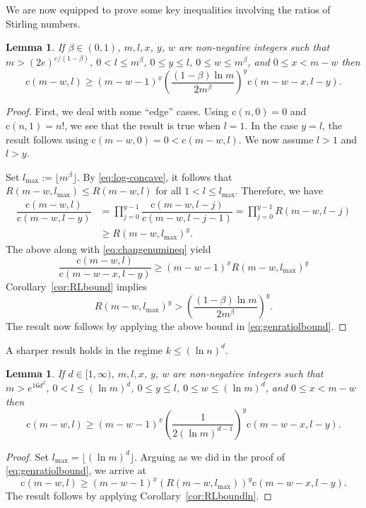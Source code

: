 \documentclass{amsart}
\newtheorem{lem}[thm]{Lemma}
\newcommand{\st}{\mathrm{c}}
\newcommand{\ff}[1]{^{\underline{#1}}}
\begin{document}
We are now equipped to prove some key inequalities involving the ratios of Stirling numbers.
\begin{lem}\label{lem:keyineq}
If $\beta \in (0,1)$, $m,l,x$, $y$, $w$ are non-negative integers such that $m>(2e)^{e/(1-\beta)}$, $0<l\leq m^{\beta}$, $0\leq y\leq l$, $0\leq w\leq m^{\beta}$, and $0\leq x< m-w$ then 
\[ \st(m-w,l) \geq  (m-w-1)\ff{x} \left(\dfrac{(1-\beta)\ln m}{2m^{\beta}} \right)^{y} \st(m-w-x,l-y). \]
\end{lem}
\begin{proof}
First, we deal with some ``edge'' cases. Using $\st(n,0)=0$ and $\st(n,1)=n!$, we see that the result is true when $l=1$. In the case $y=l$, the result follows using $\st(m-w,0)=0<\st(m-w,l)$. We now assume $l>1$ and $l>y$.

Set $l_{\max}:=\lfloor m^{\beta} \rfloor$. By \eqref{eq:log-concave}, it follows that $R(m-w,l_{\max})\leq R(m-w,l)$ for all $1<l\leq l_{\max}$. Therefore, we have
\begin{align*}
   \dfrac{\st(m-w,l)}{\st(m-w,l-y)} &=  \prod_{j=0}^{y-1} \dfrac{\st(m-w,l-j)}{\st(m-w,l-j-1)}=  \prod_{j=0}^{y-1} R(m-w,l-j)\\& \geq  R(m-w,l_{\max})^{y}.
\end{align*}
The above along with \eqref{eq:changenumineq} yield
\begin{equation}\label{eq:genratiolbound}
\dfrac{\st(m-w,l)}{\st(m-w-x,l-y)} \geq (m-w-1)\ff{x} R(m-w,l_{\max})^{y}
\end{equation}
Corollary~\ref{cor:RLbound} implies
\[ R(m-w,l_{\max})^{y} >\left(\dfrac{(1-\beta)\ln m}{2 m^{\beta}}\right)^{y}.\] The result now follows by applying the above bound in \eqref{eq:genratiolbound}.
\end{proof}
A sharper result holds in the regime $k\leq (\ln n)^{d}$.
\begin{lem}\label{lem:keyineqln}
If $d \in [1,\infty)$, $m,l,x$, $y$, $w$ are non-negative integers such that $m>e^{16d^{2}}$, $0<l\leq (\ln m)^{d}$, $0\leq y\leq l$, $0\leq w\leq (\ln m)^{d}$, and $0\leq x< m-w$ then 
\[ \st(m-w,l) \geq  (m-w-1)\ff{x} \left(\dfrac{1}{2(\ln m)^{d-1}} \right)^{y} \st(m-w-x,l-y). \]
\end{lem}
\begin{proof}
Set $l_{\max}=\lfloor (\ln m)^{d} \rfloor$. Arguing as we did in the proof of \eqref{eq:genratiolbound}, we arrive at
\[\st(m-w,l) \geq  (m-w-1)\ff{x} \left(R(m-w,l_{\max}) \right)^{y} \st(m-w-x,l-y).\] The result follows by applying Corollary~\ref{cor:RLboundln}.
\end{proof}
\end{document}
